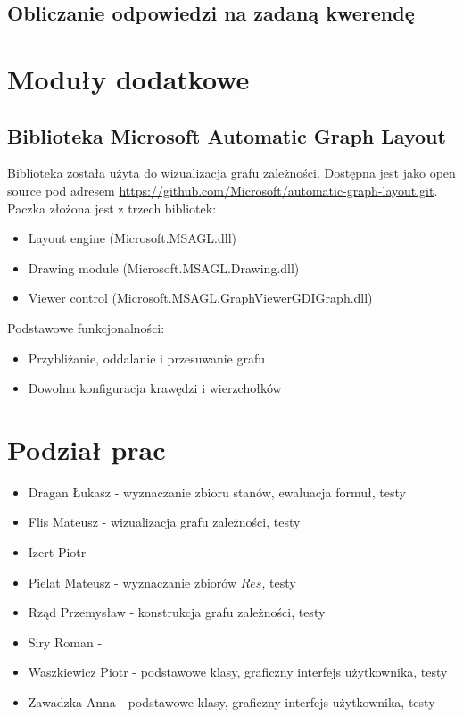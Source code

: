 \documentclass{article}
\begin{document}
\newpage
\subsection{Obliczanie odpowiedzi na zadaną kwerendę}


\newpage
\section{Moduły dodatkowe}
\subsection{Biblioteka Microsoft Automatic Graph Layout}

Biblioteka została użyta do wizualizacja grafu zależności. Dostępna jest jako open source pod adresem \url{https://github.com/Microsoft/automatic-graph-layout.git}. Paczka złożona jest z trzech bibliotek:
\begin{itemize}
    \item Layout engine (Microsoft.MSAGL.dll)
    \item Drawing module (Microsoft.MSAGL.Drawing.dll)
    \item Viewer control (Microsoft.MSAGL.GraphViewerGDIGraph.dll)
\end{itemize}
Podstawowe funkcjonalności:
\begin{itemize}
    \item Przybliżanie, oddalanie i przesuwanie grafu
    \item Dowolna konfiguracja krawędzi i wierzchołków
\end{itemize}

\newpage
\section{Podział prac}
\begin{itemize}
    \item Dragan Łukasz - wyznaczanie zbioru stanów, ewaluacja formuł, testy
    \item Flis Mateusz - wizualizacja grafu zależności, testy
    \item Izert Piotr - 
    \item Pielat Mateusz - wyznaczanie zbiorów $Res$, testy
    \item Rząd Przemysław - konstrukcja grafu zależności, testy
    \item Siry Roman - 
    \item Waszkiewicz Piotr - podstawowe klasy, graficzny interfejs użytkownika, testy
    \item Zawadzka Anna - podstawowe klasy, graficzny interfejs użytkownika, testy
\end{itemize}
\end{document}

